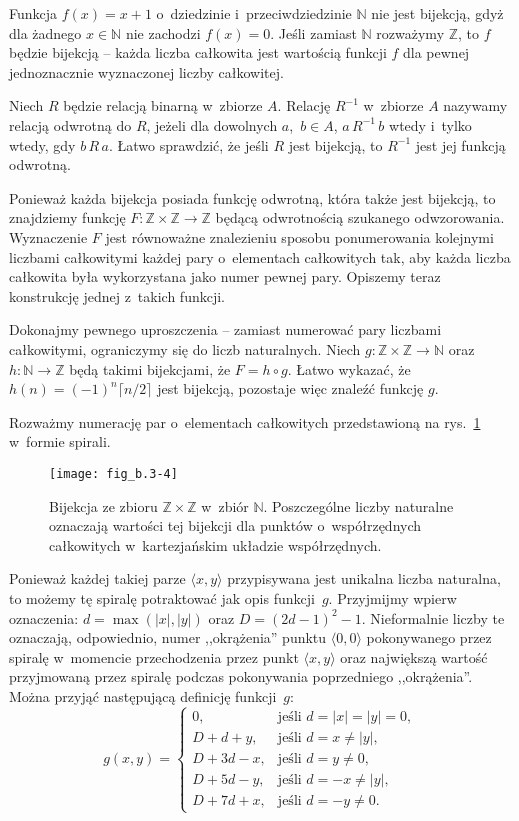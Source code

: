\exercise %
Funkcja $f(x)=x+1$ o~dziedzinie i~przeciwdziedzinie $\mathbb{N}$ nie jest bijekcją, gdyż dla żadnego $x\in\mathbb{N}$ nie zachodzi $f(x)=0$.
Jeśli zamiast $\mathbb{N}$ rozważymy $\mathbb{Z}$, to $f$ będzie bijekcją -- każda liczba całkowita jest wartością funkcji $f$ dla pewnej jednoznacznie wyznaczonej liczby całkowitej.

\exercise %
Niech $R$ będzie relacją binarną w~zbiorze $A$.
Relację $R^{-1}$ w~zbiorze $A$ nazywamy relacją odwrotną do $R$, jeżeli dla dowolnych $a$,~$b\in A$, $a\,R^{-1}\,b$ wtedy i~tylko wtedy, gdy $b\,R\,a$.
Łatwo sprawdzić, że jeśli $R$ jest bijekcją, to $R^{-1}$ jest jej funkcją odwrotną.

\exercise %
Ponieważ każda bijekcja posiada funkcję odwrotną, która także jest bijekcją, to znajdziemy funkcję $F\colon\mathbb{Z}\times\mathbb{Z}\to\mathbb{Z}$ będącą odwrotnością szukanego odwzorowania.
Wyznaczenie $F$ jest równoważne znalezieniu sposobu ponumerowania kolejnymi liczbami całkowitymi każdej pary o~elementach całkowitych tak, aby każda liczba całkowita była wykorzystana jako numer pewnej pary.
Opiszemy teraz konstrukcję jednej z~takich funkcji.

Dokonajmy pewnego uproszczenia -- zamiast numerować pary liczbami całkowitymi, ograniczymy się do liczb naturalnych.
Niech $g\colon\mathbb{Z}\times\mathbb{Z}\to\mathbb{N}$ oraz $h\colon\mathbb{N}\to\mathbb{Z}$ będą takimi bijekcjami, że $F=h\circ g$.
Łatwo wykazać, że $h(n)=(-1)^n\lceil n/2\rceil$ jest bijekcją, pozostaje więc znaleźć funkcję $g$.

Rozważmy numerację par o~elementach całkowitych przedstawioną na rys.~\ref{fig:B.3-4} w~formie spirali.
\begin{figure}[ht]
	\begin{center}
		\texttt{[image: fig\_b.3-4]}
	\end{center}
	\caption{Bijekcja ze zbioru $\mathbb{Z}\times\mathbb{Z}$ w~zbiór $\mathbb{N}$.
	Poszczególne liczby naturalne oznaczają wartości tej bijekcji dla punktów o~współrzędnych całkowitych w~kartezjańskim układzie współrzędnych.} \label{fig:B.3-4}
\end{figure}
Ponieważ każdej takiej parze $\langle x,y\rangle$ przypisywana jest unikalna liczba naturalna, to możemy tę spiralę potraktować jak opis funkcji~$g$.
Przyjmijmy wpierw oznaczenia: $d=\max(|x|,|y|)$ oraz $D=(2d-1)^2-1$.
Nieformalnie liczby te oznaczają, odpowiednio, numer ,,okrążenia'' punktu $\langle0,0\rangle$ pokonywanego przez spiralę w~momencie przechodzenia przez punkt $\langle x,y\rangle$ oraz największą wartość przyjmowaną przez spiralę podczas pokonywania poprzedniego ,,okrążenia''.
Można przyjąć następującą definicję funkcji~$g$:
\[
	g(x,y) =
	\begin{cases}
		0, & \text{jeśli $d=|x|=|y|=0$}, \\
		D+d+y, & \text{jeśli $d=x\ne|y|$}, \\
		D+3d-x, & \text{jeśli $d=y\ne0$}, \\
		D+5d-y, & \text{jeśli $d=-x\ne|y|$}, \\
		D+7d+x, & \text{jeśli $d=-y\ne0$}.
	\end{cases}
\]

